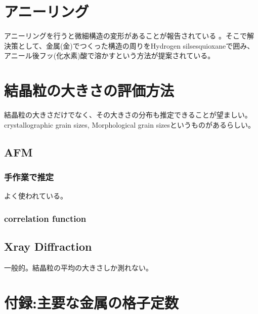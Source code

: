 \documentclass[11pt]{article}
\begin{document}
\section{アニーリング}
アニーリングを行うと微細構造の変形があることが報告されている\cite{Anneal_antennas}\cite{Anneal_MIR_grating} 。そこで解決策として、金属(金)でつくった構造の周りをHydrogen silsesquioxaneで囲み、アニール後フッ(化水素)酸で溶かすという方法が提案されている。\cite{Encapsulated_Annealing}

\section{結晶粒の大きさの評価方法}
結晶粒の大きさだけでなく、その大きさの分布も推定できることが望ましい。\\
crystallographic grain sizes, Morphological grain sizesというものがあるらしい。

\subsection{AFM}
\subsubsection{手作業で推定}
よく使われている。

\subsubsection{correlation function}
\cite{Ag_on_Ni_Ge}

\subsection{Xray Diffraction}
一般的。結晶粒の平均の大きさしか測れない。

\section*{付録:主要な金属の格子定数}
\end{document}
